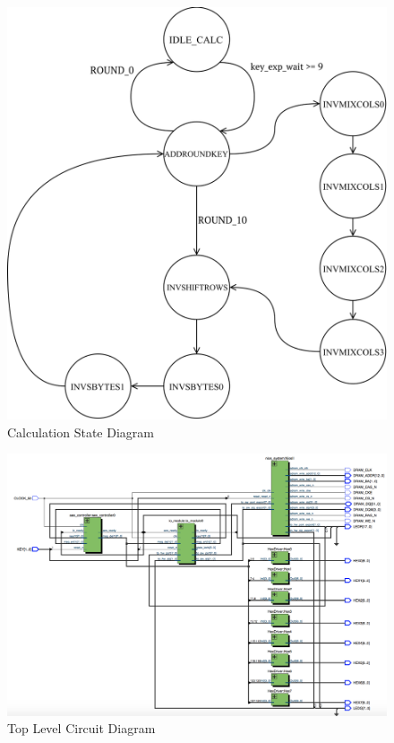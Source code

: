 \documentclass[journal, twocolumn, final,11pt,letterpaper]{IEEEtran}
\begin{document}
\begin{figure} [H]
	\centering
	\includegraphics[scale=.6]{Calc_State_Diagram.png}
	\caption{Calculation State Diagram\label{fig:calc-state}}
\end{figure}         


\begin{figure} [H]
	\centering
	\includegraphics[scale=.5]{top_level_circuit.png}
	\caption{Top Level Circuit Diagram\label{fig:top-level-circuit}}
\end{figure}   
\end{document}
